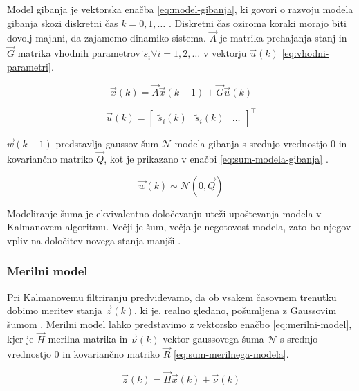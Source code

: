 {Model gibanja je vektorska enačba \eqref{eq:model-gibanja}, ki govori o razvoju modela gibanja skozi diskretni čas $k = 0,1,\ldots$ \cite{trucco1998introductory}. Diskretni čas oziroma koraki morajo biti dovolj majhni, da zajamemo dinamiko sistema. $\vec{A}$ je matrika prehajanja stanj in $\vec{G}$ matrika vhodnih parametrov $\tilde{s}_i \forall i = 1,2,\ldots$ v vektorju $\vec{u}(k)$ \eqref{eq:vhodni-parametri}. 



\begin{equation}
\vec{x}(k) = \vec{A} \vec{x}(k-1) + \vec{G} \vec{u}(k)
\label{eq:model-gibanja}
\end{equation}

\begin{equation}
\vec{u}(k) = \begin{bmatrix}
					\tilde{s}_i(k) & \tilde{s}_i(k) & \ldots
			\end{bmatrix}^\top 
\label{eq:vhodni-parametri}
\end{equation}

$\vec{w}(k-1)$ predstavlja gaussov šum $\mathcal{N}$ modela gibanja s srednjo vrednostjo $0$ in kovariančno matriko $\vec{Q}$, kot je prikazano v enačbi \eqref{eq:sum-modela-gibanja} \cite{trucco1998introductory}.

\begin{equation}
 \vec{w}(k) \sim \mathcal{N}\left(0,\vec{Q}\right)
 \label{eq:sum-modela-gibanja}
\end{equation}

Modeliranje šuma je ekvivalentno določevanju uteži upoštevanja modela v Kalmanovem algoritmu. Večji je šum, večja je negotovost modela, zato bo njegov vpliv na določitev novega stanja manjši \cite{trucco1998introductory}.


\subsubsection{Merilni model}
Pri Kalmanovemu filtriranju predvidevamo, da ob vsakem časovnem trenutku dobimo meritev stanja $\vec{z}(k)$, ki je, realno gledano, pošumljena z Gaussovim šumom \cite{trucco1998introductory}. Merilni model lahko predstavimo z vektorsko enačbo \eqref{eq:merilni-model}, kjer je $\vec{H}$ merilna matrika in $\vec{\nu}(k)$ vektor gaussovega šuma $\mathcal{N}$ s srednjo vrednostjo $0$ in kovariančno matriko $\vec{R}$ \eqref{eq:sum-merilnega-modela}.


\begin{equation}
 \vec{z}(k) = \vec{H} \vec{x}(k) + \vec{\nu}(k)
 \label{eq:merilni-model}
\end{equation}

}
